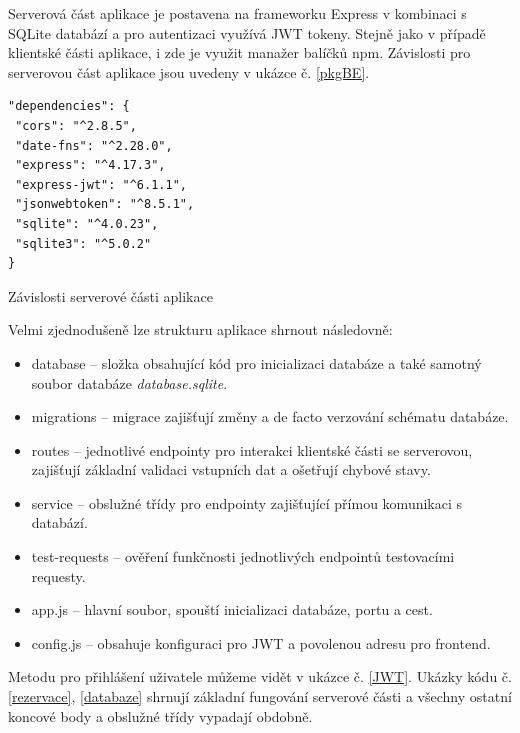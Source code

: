 \documentclass[twoside, 12pt]{article}
\begin{document}
\clearpage
{}

Serverová část aplikace je postavena na frameworku Express v kombinaci s SQLite databází a pro autentizaci využívá JWT tokeny. Stejně jako v případě klientské části aplikace, i zde je využit manažer balíčků npm. Závislosti pro serverovou část aplikace jsou uvedeny v ukázce č. \ref{pkgBE}.


\begin{listing}
\begin{verbatim}
"dependencies": {
 "cors": "^2.8.5",
 "date-fns": "^2.28.0",
 "express": "^4.17.3",
 "express-jwt": "^6.1.1",
 "jsonwebtoken": "^8.5.1",
 "sqlite": "^4.0.23",
 "sqlite3": "^5.0.2"
}
\end{verbatim}
\caption{Závislosti serverové části aplikace}
\label{pkgBE}
\end{listing}


Velmi zjednodušeně lze strukturu aplikace shrnout následovně:
\begin{itemize}
    \item database -- složka obsahující kód pro inicializaci databáze a také samotný soubor databáze \textit{database.sqlite}.
    \item migrations -- migrace zajišťují změny a de facto verzování schématu databáze.
    \item routes -- jednotlivé endpointy pro interakci klientské části se serverovou, zajišťují základní validaci vstupních dat a ošetřují chybové stavy.
    \item service -- obslužné třídy pro endpointy zajišťující přímou komunikaci s databází.
    \item test-requests -- ověření funkčnosti jednotlivých endpointů testovacími requesty.
    \item app.js -- hlavní soubor, spouští inicializaci databáze, portu a cest.
    \item config.js -- obsahuje konfiguraci pro JWT a povolenou adresu pro frontend.
\end{itemize}


Metodu pro přihlášení uživatele můžeme vidět v ukázce č. \ref{JWT}. Ukázky kódu č. \ref{rezervace}, \ref{databaze} shrnují základní fungování serverové části a všechny ostatní koncové body a obslužné třídy vypadají obdobně.
\end{document}
